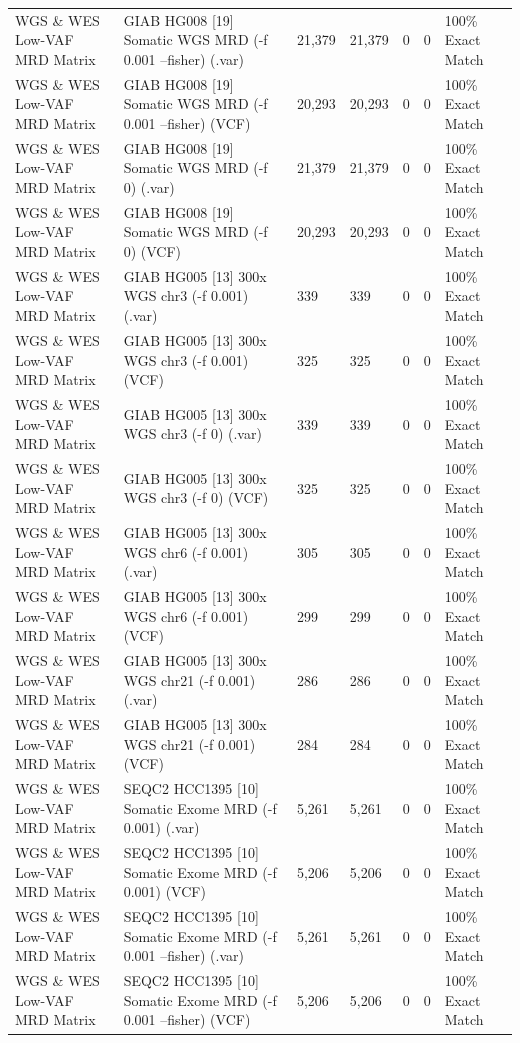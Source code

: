 \begin{table}[htbp]
{\begin{tabular}{lllllll}
WGS \& WES Low-VAF MRD Matrix & GIAB HG008 [19] Somatic WGS MRD (-f 0.001 --fisher) (.var) & 21,379 & 21,379 & 0 & 0 & 100\% Exact Match \\
WGS \& WES Low-VAF MRD Matrix & GIAB HG008 [19] Somatic WGS MRD (-f 0.001 --fisher) (VCF) & 20,293 & 20,293 & 0 & 0 & 100\% Exact Match \\
WGS \& WES Low-VAF MRD Matrix & GIAB HG008 [19] Somatic WGS MRD (-f 0) (.var) & 21,379 & 21,379 & 0 & 0 & 100\% Exact Match \\
WGS \& WES Low-VAF MRD Matrix & GIAB HG008 [19] Somatic WGS MRD (-f 0) (VCF) & 20,293 & 20,293 & 0 & 0 & 100\% Exact Match \\
WGS \& WES Low-VAF MRD Matrix & GIAB HG005 [13] 300x WGS chr3 (-f 0.001) (.var) & 339 & 339 & 0 & 0 & 100\% Exact Match \\
WGS \& WES Low-VAF MRD Matrix & GIAB HG005 [13] 300x WGS chr3 (-f 0.001) (VCF) & 325 & 325 & 0 & 0 & 100\% Exact Match \\
WGS \& WES Low-VAF MRD Matrix & GIAB HG005 [13] 300x WGS chr3 (-f 0) (.var) & 339 & 339 & 0 & 0 & 100\% Exact Match \\
WGS \& WES Low-VAF MRD Matrix & GIAB HG005 [13] 300x WGS chr3 (-f 0) (VCF) & 325 & 325 & 0 & 0 & 100\% Exact Match \\
WGS \& WES Low-VAF MRD Matrix & GIAB HG005 [13] 300x WGS chr6 (-f 0.001) (.var) & 305 & 305 & 0 & 0 & 100\% Exact Match \\
WGS \& WES Low-VAF MRD Matrix & GIAB HG005 [13] 300x WGS chr6 (-f 0.001) (VCF) & 299 & 299 & 0 & 0 & 100\% Exact Match \\
WGS \& WES Low-VAF MRD Matrix & GIAB HG005 [13] 300x WGS chr21 (-f 0.001) (.var) & 286 & 286 & 0 & 0 & 100\% Exact Match \\
WGS \& WES Low-VAF MRD Matrix & GIAB HG005 [13] 300x WGS chr21 (-f 0.001) (VCF) & 284 & 284 & 0 & 0 & 100\% Exact Match \\
WGS \& WES Low-VAF MRD Matrix & SEQC2 HCC1395 [10] Somatic Exome MRD (-f 0.001) (.var) & 5,261 & 5,261 & 0 & 0 & 100\% Exact Match \\
WGS \& WES Low-VAF MRD Matrix & SEQC2 HCC1395 [10] Somatic Exome MRD (-f 0.001) (VCF) & 5,206 & 5,206 & 0 & 0 & 100\% Exact Match \\
WGS \& WES Low-VAF MRD Matrix & SEQC2 HCC1395 [10] Somatic Exome MRD (-f 0.001 --fisher) (.var) & 5,261 & 5,261 & 0 & 0 & 100\% Exact Match \\
WGS \& WES Low-VAF MRD Matrix & SEQC2 HCC1395 [10] Somatic Exome MRD (-f 0.001 --fisher) (VCF) & 5,206 & 5,206 & 0 & 0 & 100\% Exact Match \\

\end{tabular}}
\end{table}
